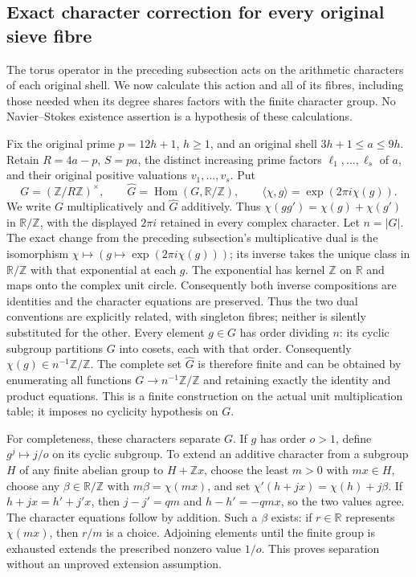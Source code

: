 \subsection{Exact character correction for every original sieve fibre}
\label{sec:ns-character-sieve}

The torus operator in the preceding subsection acts on the arithmetic
characters of each original shell. We now calculate this action and all
of its fibres, including those needed when its degree shares factors with
the finite character group. No Navier--Stokes existence assertion is a
hypothesis of these calculations.

Fix the original prime $p=12h+1$, $h\geq1$, and an original shell
$3h+1\leq a\leq9h$. Retain $R=4a-p$, $S=pa$, the distinct increasing
prime factors $\ell_1,\ldots,\ell_s$ of $a$, and their original positive
valuations $v_1,\ldots,v_s$. Put
\[
 G=(\mathbb Z/R\mathbb Z)^\times,\qquad
 \widehat G=\operatorname{Hom}(G,\mathbb R/\mathbb Z),\qquad
 \langle\chi,g\rangle=\exp(2\pi i\chi(g)).
\]
We write $G$ multiplicatively and $\widehat G$ additively. Thus
$\chi(gg')=\chi(g)+\chi(g')$ in $\mathbb R/\mathbb Z$, with the
displayed $2\pi i$ retained in every complex character. Let $n=|G|$.
The exact change from the preceding subsection's multiplicative
dual is the isomorphism
$\chi\mapsto(g\mapsto\exp(2\pi i\chi(g)))$; its inverse takes the
unique class in $\mathbb R/\mathbb Z$ with that exponential at each
$g$. The exponential has kernel $\mathbb Z$ on $\mathbb R$ and
maps onto the complex unit circle. Consequently both inverse
compositions are identities and the character equations are preserved.
Thus the two dual conventions are explicitly related, with singleton
fibres; neither is silently substituted for the other.
Every element $g\in G$ has order dividing $n$: its cyclic subgroup
partitions $G$ into cosets, each with that order. Consequently
$\chi(g)\in n^{-1}\mathbb Z/\mathbb Z$. The complete set $\widehat G$
is therefore finite and can be obtained by enumerating all functions
$G\to n^{-1}\mathbb Z/\mathbb Z$ and retaining exactly the identity
and product equations. This is a finite construction on the actual
unit multiplication table; it imposes no cyclicity hypothesis on $G$.

For completeness, these characters separate $G$. If $g$ has order
$o>1$, define $g^j\mapsto j/o$ on its cyclic subgroup. To extend an
additive character from a subgroup $H$ of any finite abelian group to
$H+\mathbb Zx$, choose the least $m>0$ with $mx\in H$, choose any
$\beta\in\mathbb R/\mathbb Z$ with $m\beta=\chi(mx)$, and set
$\chi'(h+jx)=\chi(h)+j\beta$. If $h+jx=h'+j'x$, then
$j-j'=qm$ and $h-h'=-qmx$, so the two values agree. The character
equations follow by addition. Such a $\beta$ exists: if $r\in\mathbb R$
represents $\chi(mx)$, then $r/m$ is a choice. Adjoining elements
until the finite group is exhausted extends the prescribed nonzero
value $1/o$. This proves separation without an unproved extension
assumption.


